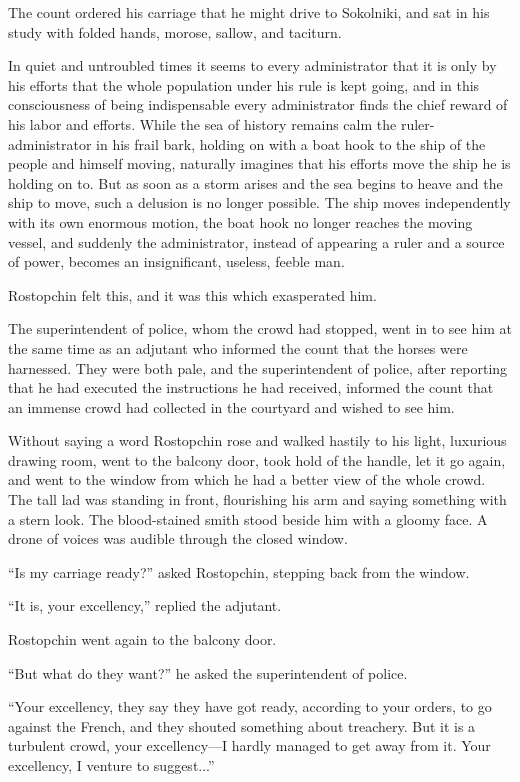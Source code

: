 The count ordered his carriage that he might drive to Sokolniki,
and sat in his study with folded hands, morose, sallow, and
taciturn.

In quiet and untroubled times it seems to every administrator
that it is only by his efforts that the whole population under
his rule is kept going, and in this consciousness of being
indispensable every administrator finds the chief reward of his
labor and efforts. While the sea of history remains calm the
ruler-administrator in his frail bark, holding on with a boat
hook to the ship of the people and himself moving, naturally
imagines that his efforts move the ship he is holding on to. But
as soon as a storm arises and the sea begins to heave and the
ship to move, such a delusion is no longer possible. The ship
moves independently with its own enormous motion, the boat hook
no longer reaches the moving vessel, and suddenly the
administrator, instead of appearing a ruler and a source of
power, becomes an insignificant, useless, feeble man.

Rostopchin felt this, and it was this which exasperated him.

The superintendent of police, whom the crowd had stopped, went in
to see him at the same time as an adjutant who informed the count
that the horses were harnessed. They were both pale, and the
superintendent of police, after reporting that he had executed
the instructions he had received, informed the count that an
immense crowd had collected in the courtyard and wished to see
him.

Without saying a word Rostopchin rose and walked hastily to his
light, luxurious drawing room, went to the balcony door, took
hold of the handle, let it go again, and went to the window from
which he had a better view of the whole crowd. The tall lad was
standing in front, flourishing his arm and saying something with
a stern look. The blood-stained smith stood beside him with a
gloomy face. A drone of voices was audible through the closed
window.

``Is my carriage ready?'' asked Rostopchin, stepping back from
the window.

``It is, your excellency,'' replied the adjutant.

Rostopchin went again to the balcony door.

``But what do they want?'' he asked the superintendent of police.

``Your excellency, they say they have got ready, according to
your orders, to go against the French, and they shouted something
about treachery. But it is a turbulent crowd, your excellency---I
hardly managed to get away from it. Your excellency, I venture to
suggest...''

